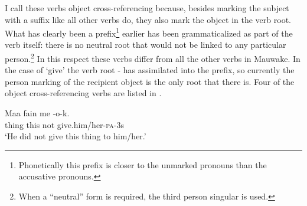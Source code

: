 I call these verbs object cross-referencing because, besides marking the subject with a suffix like all other verbs do, they also  mark the object in the verb root. What has clearly been a prefix\footnote{Phonetically this prefix is closer to the unmarked pronouns than the accusative pronouns.} earlier has been grammaticalized as part of the verb itself: there is no neutral root that would not be linked to any particular person.\footnote{When a ``neutral'' form is required, the third person singular is used.} In this respect these verbs differ from all the other verbs in Mauwake. In the case of `give' the verb root - has assimilated into the prefix, so currently the person marking of the recipient object is the only root that there is. Four of the object cross-referencing verbs are listed in .

\begin{table}
 \caption{Cross-referencing verbs}
\label{tab:3:crossreferencingverbs}
\end{table}


\ea%
\label{ex:3:x334}
\gll Maa fain me -o-k. \\
thing this not give.him/her-\textsc{pa}-3s \\
\glt`He did not give this thing to him/her.'
\z

